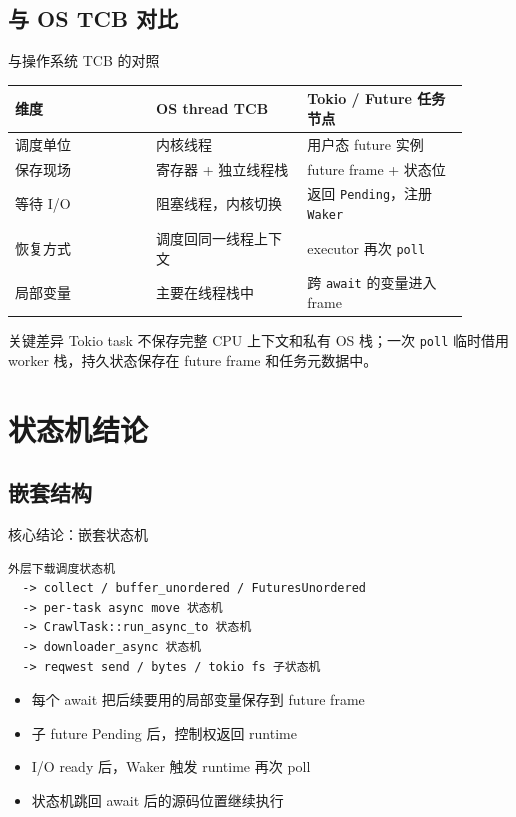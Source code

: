 \documentclass[aspectratio=169,11pt]{beamer}
\begin{document}
\subsection{与 OS TCB 对比}

\begin{frame}{与操作系统 TCB 的对照}
  \begin{tabular}{p{0.28\linewidth}p{0.30\linewidth}p{0.32\linewidth}}
    \toprule
    维度 & OS thread TCB & Tokio / Future 任务节点 \\
    \midrule
    调度单位 & 内核线程 & 用户态 future 实例 \\
    保存现场 & 寄存器 + 独立线程栈 & future frame + 状态位 \\
    等待 I/O & 阻塞线程，内核切换 & 返回 \texttt{Pending}，注册 \texttt{Waker} \\
    恢复方式 & 调度回同一线程上下文 & executor 再次 \texttt{poll} \\
    局部变量 & 主要在线程栈中 & 跨 \texttt{await} 的变量进入 frame \\
    \bottomrule
  \end{tabular}

  \vspace{0.8em}
  \begin{alertblock}{关键差异}
    Tokio task 不保存完整 CPU 上下文和私有 OS 栈；一次 \texttt{poll} 临时借用 worker 栈，持久状态保存在 future frame 和任务元数据中。
  \end{alertblock}
\end{frame}

\section{状态机结论}
\subsection{嵌套结构}

\begin{frame}[fragile]{核心结论：嵌套状态机}
  \begin{lstlisting}
外层下载调度状态机
  -> collect / buffer_unordered / FuturesUnordered
  -> per-task async move 状态机
  -> CrawlTask::run_async_to 状态机
  -> downloader_async 状态机
  -> reqwest send / bytes / tokio fs 子状态机
  \end{lstlisting}

  \begin{itemize}
    \item 每个 await 把后续要用的局部变量保存到 future frame
    \item 子 future Pending 后，控制权返回 runtime
    \item I/O ready 后，Waker 触发 runtime 再次 poll
    \item 状态机跳回 await 后的源码位置继续执行
  \end{itemize}
\end{frame}
\end{document}

